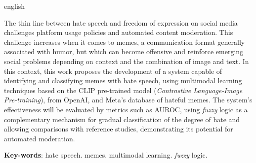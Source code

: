 \begin{resumo}[Abstract]
 \begin{otherlanguage*}{english}
  
   The thin line between hate speech and freedom of expression on social media challenges platform usage policies and automated content moderation. This challenge increases when it comes to memes, a communication format generally associated with humor, but which can become offensive and reinforce emerging social problems depending on context and the combination of image and text. In this context, this work proposes the development of a system capable of identifying and classifying memes with hate speech, using multimodal learning techniques based on the CLIP pre-trained model (\textit{Contrastive Language-Image Pre-training}), from OpenAI, and Meta's database of hateful memes. The system's effectiveness will be evaluated by metrics such as AUROC, using \textit{fuzzy} logic as a complementary mechanism for gradual classification of the degree of hate and allowing comparisons with reference studies, demonstrating its potential for automated moderation.

   \vspace{\onelineskip}
 
   \noindent 
   \textbf{Key-words}: hate speech. memes. multimodal learning. \textit{fuzzy} logic.
 \end{otherlanguage*}
\end{resumo}